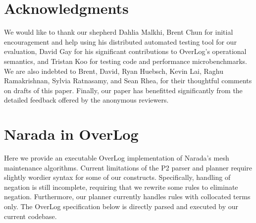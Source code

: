 \documentclass{sig-alt-full}
\def\Sys{P2\xspace}
\def\Lang{OverLog\xspace}
\begin{document}
\section{Acknowledgments}
We would like to thank our shepherd Dahlia Malkhi, Brent Chun for initial
encouragement and help using 
his distributed automated testing tool for our evaluation,
David Gay for his significant contributions to \Lang's operational
semantics, and Tristan Koo for testing code and performance
microbenchmarks.  We are also indebted to Brent, David, Ryan Huebsch,
Kevin Lai, Raghu Ramakrishnan, Sylvia Ratnasamy, and Sean Rhea, for
their thoughtful comments on drafts of this paper. Finally, our paper
has benefitted significantly from the detailed feedback offered by the
anonymous reviewers. 

{\small

}
\newpage
\appendix

\section{Narada in \Lang}
\label{sec:naradaOverlog}

Here we provide an executable \Lang implementation of Narada's mesh
maintenance algorithms. Current limitations of the \Sys parser and
planner require slightly wordier syntax for some of our 
constructs.  Specifically, handling of negation is still incomplete,
requiring that we rewrite some rules to eliminate negation.
Furthermore, our planner currently handles rules with collocated terms
only.  The \Lang specification below is directly parsed and executed by our
current codebase.
\end{document}

